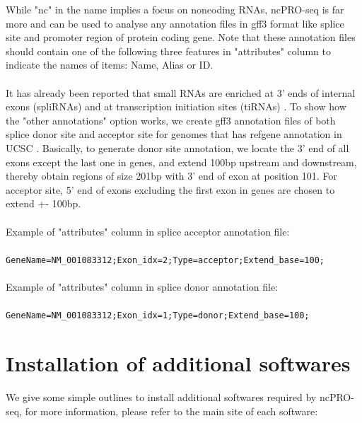 \documentclass[12pt]{article}
\def \ncpip{ncPRO-seq}
\begin{document}
While "nc" in the name implies a focus on noncoding RNAs, \ncpip{} is far more and can be used to analyse any annotation files in gff3 format like splice site and promoter region of protein coding gene. Note that these annotation files should contain one of the following three features in "attributes" column to indicate the names of items: Name, Alias or ID. \\\\
It has already been reported that small RNAs are enriched at 3' ends of internal exons (spliRNAs) and at transcription initiation sites (tiRNAs) \cite{Taft2010}. To show how the "other annotations" option works, we create gff3 annotation files of both splice donor site and acceptor site for genomes that has refgene annotation in UCSC \cite{Dreszer2012}. Basically, to generate donor site annotation, we locate the 3' end of all exons except the last one in genes, and extend 100bp upstream and downstream, thereby obtain regions of size 201bp with 3' end of exon at position 101. For acceptor site, 5' end of exons excluding the first exon in genes are chosen to extend +- 100bp. \\\\
Example of "attributes" column in splice acceptor annotation file:\\\\
\verb|GeneName=NM_001083312;Exon_idx=2;Type=acceptor;Extend_base=100;|\\\\
Example of "attributes" column in splice donor annotation file:\\\\
\verb|GeneName=NM_001083312;Exon_idx=1;Type=donor;Extend_base=100;|

\section{Installation of additional softwares}
\label{subsection:additional}

We give some simple outlines to install additional  softwares required by \ncpip{}, for more information, please refer to the main site of each software:
\end{document}
